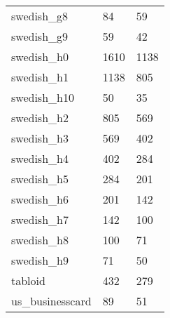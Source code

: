 {\begin{supertabular}{|lll|}
                swedish\_g8 &     84 &     59 \\
                swedish\_g9 &     59 &     42 \\
                swedish\_h0 &   1610 &   1138 \\
                swedish\_h1 &   1138 &    805 \\
               swedish\_h10 &     50 &     35 \\
                swedish\_h2 &    805 &    569 \\
                swedish\_h3 &    569 &    402 \\
                swedish\_h4 &    402 &    284 \\
                swedish\_h5 &    284 &    201 \\
                swedish\_h6 &    201 &    142 \\
                swedish\_h7 &    142 &    100 \\
                swedish\_h8 &    100 &     71 \\
                swedish\_h9 &     71 &     50 \\
                    tabloid &    432 &    279 \\
           us\_businesscard &     89 &     51 \\
\end{supertabular}
}\onecolumn


